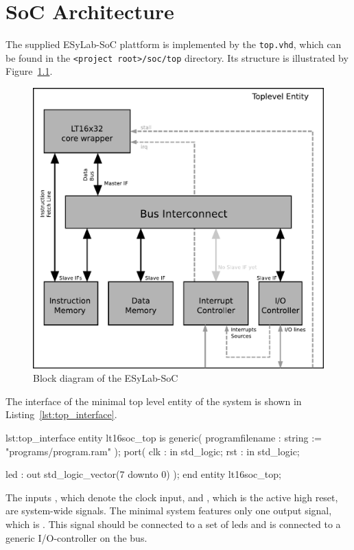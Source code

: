 \chapter{SoC Architecture}\label{chap:socarch}
The supplied ESyLab-SoC plattform is implemented by the \verb=top.vhd=,
which can be found in the \verb=<project root>/soc/top= directory.
Its structure is illustrated by Figure~\ref{fig:socoverview}.
\begin{figure}[htb]
	\centering
	\includegraphics[scale=0.55]{./figures/soc_overview.pdf}
	\caption{Block diagram of the ESyLab-SoC}
	\label{fig:socoverview}
\end{figure}

The interface of the minimal top level entity of the \procname system is shown in Listing~\ref{lst:top_interface}.
\begin{vhdl}{lst:top_interface}
entity lt16soc_top is
generic(
  programfilename : string := "programs/program.ram"
);
port(
  clk		: in  std_logic;
  rst		: in std_logic;
  
  led		: out std_logic_vector(7 downto 0)
);
end entity lt16soc_top;
\end{vhdl}

The inputs , which denote the clock input, and , which is the active high reset, are system-wide signals. 
The minimal system features only one output signal, which is .
This signal should be connected to a set of leds and is connected to a generic I/O-controller on the bus.

